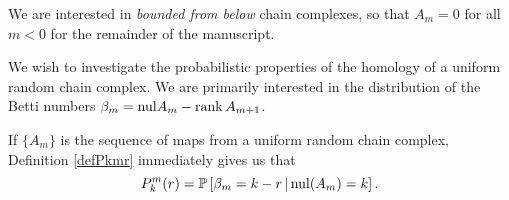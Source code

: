\begin{remark}
  \label{rem:bdd}
  We are interested in {\em bounded from below} chain complexes, so that $A_m = 0$ for all $m < 0$
  for the remainder of the manuscript.
\end{remark}



We wish to investigate the probabilistic properties of the homology of a uniform random
chain complex.  We are primarily interested in the distribution of the Betti
numbers $\beta_m = \mathrm{nul} A_m - \operatorname{\mathrm{rank}} A_{m+1}$.

\begin{remark}
If $\{A_m\}$ is the sequence of maps from a uniform random chain complex, Definition
\ref{defPkmr} immediately gives us that
\[
  P^m_k(r) = \mathbb{P}\left[\beta_m = k-r \,|\, \mathrm{nul}(A_{m}) = k\right].
\]
\end{remark}





